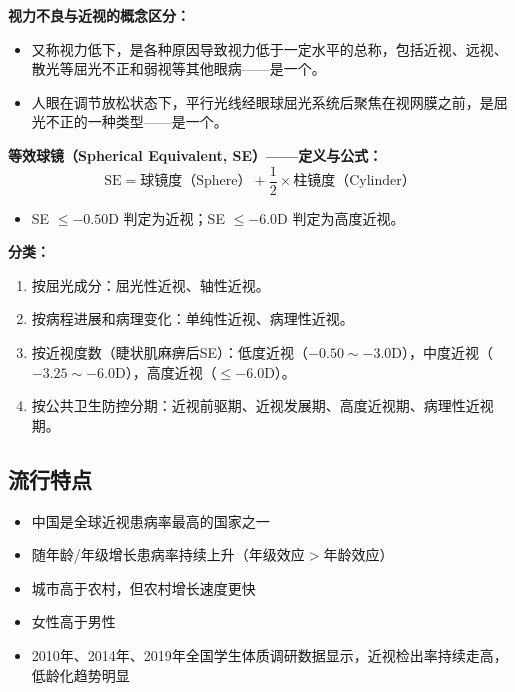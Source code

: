 \begin{defbox}
\textbf{视力不良与近视的概念区分：}
\begin{itemize}[leftmargin=*]
    \item {}又称视力低下，是各种原因导致视力低于一定水平的总称，包括近视、远视、散光等屈光不正和弱视等其他眼病——是一个。
    \item {}人眼在调节放松状态下，平行光线经眼球屈光系统后聚焦在视网膜之前，是屈光不正的一种类型——是一个。
\end{itemize}

\textbf{等效球镜（Spherical Equivalent, SE）——定义与公式：}
\[\boxed{\text{SE} = \text{球镜度（Sphere）} + \frac{1}{2} \times \text{柱镜度（Cylinder）}}\]
\begin{itemize}[leftmargin=*]
    \item {}SE $\leq -0.50$D 判定为近视；SE $\leq -6.0$D 判定为高度近视。
\end{itemize}

\textbf{分类：}
\begin{enumerate}[leftmargin=*]
    \item 按屈光成分：屈光性近视、轴性近视。
    \item 按病程进展和病理变化：单纯性近视、病理性近视。
    \item 按近视度数（睫状肌麻痹后SE）：低度近视（$-0.50\sim-3.0$D），中度近视（$-3.25\sim-6.0$D），高度近视（$\leq -6.0$D）。
    \item 按公共卫生防控分期：近视前驱期、近视发展期、高度近视期、病理性近视期。
\end{enumerate}
\end{defbox}

\subsection{流行特点}

\begin{keybox}
\begin{itemize}[leftmargin=*]
    \item 中国是全球近视患病率最高的国家之一
    \item 随年龄/年级增长患病率持续上升（年级效应$>$年龄效应）
    \item 城市高于农村，但农村增长速度更快
    \item 女性高于男性
    \item 2010年、2014年、2019年全国学生体质调研数据显示，近视检出率持续走高，低龄化趋势明显
\end{itemize}
\end{keybox}

